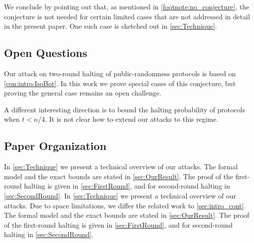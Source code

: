 	
We conclude by pointing out that, as mentioned in \cref{footnote:no_conjecture},
the conjecture is not needed for certain limited cases that are not addressed in detail in the present paper. One such case is sketched out in \cref{sec:Technique}.


\ifdefined\IsFullVersion


\subsection{Open Questions}\label{sec:OpenQuest}
Our attack on two-round halting of public-randomness protocols is based on \cref{con:intro:IsoBot}. In this work we prove special cases of this conjecture, but proving the general case remains an open challenge.

A different interesting direction is to bound the halting probability of protocols when $t<n/4$. It is not clear how to extend our attacks to this regime.
\fi

\subsection*{Paper Organization}

\ifdefined\IsFullVersion
In \cref{sec:Technique} we present a technical overview of our attacks. The formal model and the exact bounds are stated in \cref{sec:OurResult}. The proof of the first-round halting is given in \cref{sec:FirstRound}, and for second-round halting in \cref{sec:SecondRound}.
\else
In \cref{sec:Technique} we present a technical overview of our attacks. Due to space limitations, we differ the related work to \cref{sec:intro_cont}. The formal model and the exact bounds are stated in \cref{sec:OurResult}. The proof of the first-round halting is given in \cref{sec:FirstRound}, and for second-round halting in \cref{sec:SecondRound}.
\fi

